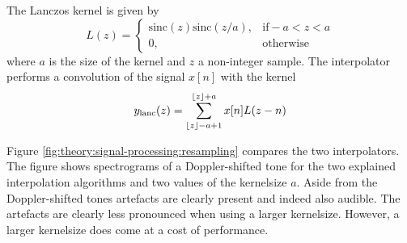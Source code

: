 The Lanczos kernel is given by
\begin{equation}
 L(z) = \begin{cases}
         \textrm{sinc}(z) \textrm{sinc}(z/a), & \textrm{if} -a < z < a \\
         0, & \text{otherwise}
        \end{cases}
\end{equation}
where $a$ is the size of the kernel and $z$ a non-integer sample.
The interpolator performs a convolution of the signal $x[n]$ with the kernel
\begin{equation}
 y_{\mathrm{lanc}}(z) = \sum_{\lfloor z\rfloor - a + 1}^{\lfloor z\rfloor + a} x[n] L(z-n)
\end{equation}

Figure \ref{fig:theory:signal-processing:resampling} compares the two
interpolators. The figure shows spectrograms of a Doppler-shifted tone for the
two explained interpolation algorithms and two values of the kernelsize $a$.
Aside from the Doppler-shifted tones artefacts are clearly present and indeed
also audible. The artefacts are clearly less pronounced when using a larger
kernelsize. However, a larger kernelsize does come at a cost of performance.



%



